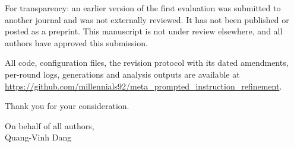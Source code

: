 \documentclass[11pt]{article}
\begin{document}
\bigskip
For transparency: an earlier version of the first evaluation was submitted to another journal and was not
externally reviewed. It has not been published or posted as a preprint. This manuscript is not under review
elsewhere, and all authors have approved this submission.

\bigskip
All code, configuration files, the revision protocol with its dated amendments, per-round logs, generations
and analysis outputs are available at
\url{https://github.com/millennials92/meta_prompted_instruction_refinement}.

\bigskip
Thank you for your consideration.

\bigskip
On behalf of all authors,\\
Quang-Vinh Dang
\end{document}
